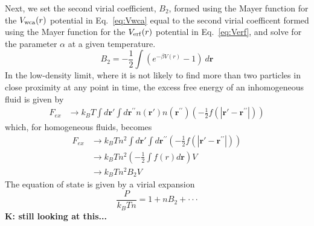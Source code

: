 \documentclass[letterpaper,twocolumn,amsmath,amssymb,prb]{revtex4-1}
\newcommand\davidsays[1]{{\bf \color{blue}D: #1}}
\newcommand\kirstiesays[1]{{\bf \color{red}K: #1}}
\begin{document}
Next, we set the second virial coefficient, $B_2$, formed using the Mayer 
function for the $V_{\mathrm{wca}}(r)$ potential 
in Eq.~\ref{eq:Vwca} equal to the second virial coefficent formed using 
the Mayer function for the $V_{\mathrm{erf}}(r)$ potential in Eq.~\ref{eq:Verf}, 
and solve for the parameter $\alpha$ at a given temperature.
\begin{equation}B_2=-\frac{1}{2}\int (e^{-\beta V(r)} - 1)~d\textbf{r}\end{equation}
In the low-density limit, where it is not likely to find more than two
particles in close proximity at any point in time, 
the excess free energy of an inhomogeneous fluid is given by
\begin{align}\label{eq:Fexcess_low-density_homogeneous}
    F_{ex} &\rightarrow k_BT\int d\textbf{r}'\int d\textbf{r}^{\prime\prime} n(\textbf{r}')
    n(\textbf{r}^{\prime\prime})\left(-\frac{1}{2}f(|\textbf{r}'-\textbf{r}^{\prime\prime}|)\right) 
\end{align} 
which, for homogeneous fluids, becomes
\begin{align}\label{eq:Fexcess_low-density_inhomogeneous}
    F_{ex} &\rightarrow k_BTn^2\int d\textbf{r}'\int d\textbf{r}^{\prime\prime}\left(-\frac{1}{2}f(|\textbf{r}'-\textbf{r}^{\prime\prime}|)\right) \\
           &\rightarrow k_BTn^2\left(-\frac{1}{2}\int{f(r)}{d\textbf{r}}\right)V \\
           &\rightarrow k_BTn^2B_2V
\end{align} 
The equation of state  is given by a virial expansion 
\begin{equation}\frac{P}{k_BTn}=1+nB_2+ \cdot\cdot\cdot \end{equation}  %
\kirstiesays{still looking at this...}
\end{document}
